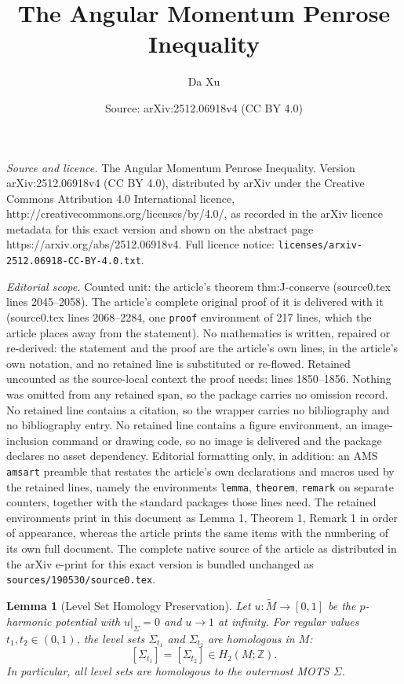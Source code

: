 \documentclass[10pt,a4paper]{amsart}
\title{The Angular Momentum Penrose Inequality}
\author{Da Xu}
\date{Source: arXiv:2512.06918v4 (CC BY 4.0)}
\newtheorem{lemma}{Lemma}
\newcommand{\tM}{\tilde{M}}
\begin{document}
\maketitle

\noindent\emph{Source and licence.} The Angular Momentum Penrose Inequality. Version arXiv:2512.06918v4 (CC BY 4.0), distributed by arXiv under the Creative Commons Attribution 4.0 International licence, http://creativecommons.org/licenses/by/4.0/, as recorded in the arXiv licence metadata for this exact version and shown on the abstract page https://arxiv.org/abs/2512.06918v4. Full licence notice: \texttt{licenses/arxiv-2512.06918-CC-BY-4.0.txt}.\par\smallskip

\noindent\textit{Editorial scope.} Counted unit: the article's theorem thm:J-conserve (source0.tex lines 2045--2058). The article's complete original proof of it is delivered with it (source0.tex lines 2068--2284, one \texttt{proof} environment of 217 lines, which the article places away from the statement). No mathematics is written, repaired or re-derived: the statement and the proof are the article's own lines, in the article's own notation, and no retained line is substituted or re-flowed.  Retained uncounted as the source-local context the proof needs: lines 1850--1856.  Nothing was omitted from any retained span, so the package carries no omission record.  No retained line contains a citation, so the wrapper carries no bibliography and no bibliography entry.  No retained line contains a figure environment, an image-inclusion command or drawing code, so no image is delivered and the package declares no asset dependency.  Editorial formatting only, in addition: an AMS \texttt{amsart} preamble that restates the article's own declarations and macros used by the retained lines, namely the environments \texttt{lemma}, \texttt{theorem}, \texttt{remark} on separate counters, together with the standard packages those lines need.  The retained environments print in this document as Lemma 1, Theorem 1, Remark 1 in order of appearance, whereas the article prints the same items with the numbering of its own full document.  The complete native source of the article as distributed in the arXiv e-print for this exact version is bundled unchanged as \texttt{sources/190530/source0.tex}.
\begin{lemma}[Level Set Homology Preservation]\label{lem:homology}
Let $u: \tM \to [0, 1]$ be the $p$-harmonic potential with $u|_\Sigma = 0$ and $u \to 1$ at infinity. For regular values $t_1, t_2 \in (0, 1)$, the level sets $\Sigma_{t_1}$ and $\Sigma_{t_2}$ are homologous in $M$:
\[
[\Sigma_{t_1}] = [\Sigma_{t_2}] \in H_2(M; \mathbb{Z}).
\]
In particular, all level sets are homologous to the outermost MOTS $\Sigma$.
\end{lemma}
\end{document}

